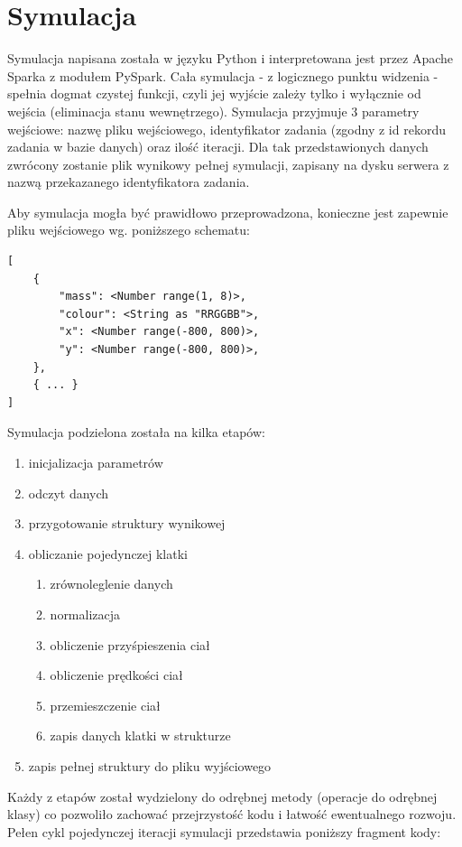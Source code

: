 \documentclass[a4paper,onecolumn,oneside,12pt]{memoir}
\begin{document}
{\section{Symulacja}
\quad \quad Symulacja napisana została w języku Python i interpretowana jest przez Apache Sparka
z modułem PySpark. Cała symulacja - z logicznego punktu widzenia - spełnia dogmat czystej funkcji,
czyli jej wyjście zależy tylko i wyłącznie od wejścia (eliminacja stanu wewnętrzego). Symulacja
przyjmuje 3 parametry wejściowe: nazwę pliku wejściowego, identyfikator zadania (zgodny z id
rekordu zadania w bazie danych) oraz ilość iteracji. Dla tak przedstawionych danych zwrócony
zostanie plik wynikowy pełnej symulacji, zapisany na dysku serwera z nazwą przekazanego
identyfikatora zadania.

Aby symulacja mogła być prawidłowo przeprowadzona, konieczne jest zapewnie pliku wejściowego
wg. poniższego schematu:

\begin{lstlisting}[caption=Plik wejściowy symulacji]
[
    {
        "mass": <Number range(1, 8)>,
        "colour": <String as "RRGGBB">,
        "x": <Number range(-800, 800)>,
        "y": <Number range(-800, 800)>,
    },
    { ... }
]
\end{lstlisting}

Symulacja podzielona została na kilka etapów:
\begin{enumerate}
\item inicjalizacja parametrów
\item odczyt danych
\item przygotowanie struktury wynikowej
\item obliczanie pojedynczej klatki
	\begin{enumerate}
	\item zrównoleglenie danych
	\item normalizacja
	\item obliczenie przyśpieszenia ciał
	\item obliczenie prędkości ciał
	\item przemieszczenie ciał
	\item zapis danych klatki w strukturze
	\end{enumerate}
\item zapis pełnej struktury do pliku wyjściowego
\end{enumerate}

Każdy z etapów został wydzielony do odrębnej metody (operacje do odrębnej klasy) co
pozwoliło zachować przejrzystość kodu i łatwość ewentualnego rozwoju. Pełen cykl
pojedynczej iteracji symulacji przedstawia poniższy fragment kody:

}
\end{document}

